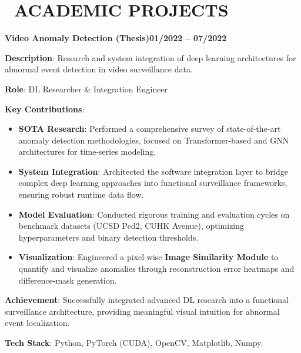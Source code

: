 \documentclass[letterpaper,10pt]{article}
\newcommand{\heading}[2]{
  \hspace{10pt}#1\hfill#2\\
}
\newcommand{\headingBf}[2]{
  \heading{\textbf{#1}}{\textbf{#2}}
}
\newenvironment{resume_list}{
  \vspace{-7pt}
  \begin{itemize}[itemsep=-2px, parsep=1pt, leftmargin=30pt]
}{
  \end{itemize}
}
\begin{document}
   \section{\faGraduationCap\ ACADEMIC PROJECTS}

   \headingBf{Video Anomaly Detection (Thesis)}{01/2022 -- 07/2022}
   \begin{resume_list}
     \item \textbf{Description}: Research and system integration of deep learning architectures for abnormal event detection in video surveillance data.
     \item \textbf{Role}: DL Researcher \& Integration Engineer
     \item \textbf{Key Contributions}:
        \begin{itemize}[itemsep=0pt, leftmargin=10pt, label=$\circ$]
           \item \textbf{SOTA Research}: Performed a comprehensive survey of state-of-the-art anomaly detection methodologies, focused on Transformer-based and GNN architectures for time-series modeling.
           \item \textbf{System Integration}: Architected the software integration layer to bridge complex deep learning approaches into functional surveillance frameworks, ensuring robust runtime data flow.
           \item \textbf{Model Evaluation}: Conducted rigorous training and evaluation cycles on benchmark datasets (UCSD Ped2, CUHK Avenue), optimizing hyperparameters and binary detection thresholds.
           \item \textbf{Visualization}: Engineered a pixel-wise \textbf{Image Similarity Module} to quantify and visualize anomalies through reconstruction error heatmaps and difference-mask generation.
        \end{itemize}
     \item \textbf{Achievement}: Successfully integrated advanced DL research into a functional surveillance architecture, providing meaningful visual intuition for abnormal event localization.
     \item \textbf{Tech Stack}: Python, PyTorch (CUDA), OpenCV, Matplotlib, Numpy.
   \end{resume_list}
\end{document}
